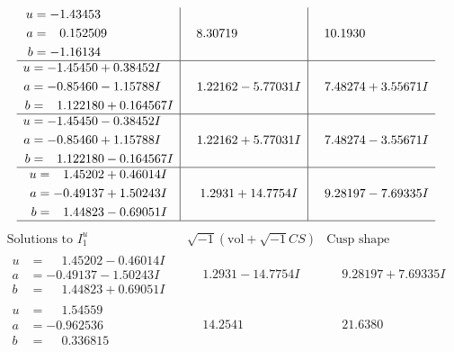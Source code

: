 \documentclass[1p]{elsarticle_modified}
\theoremstyle{definition}
\newcommand{\I}{\sqrt{-1}}
\begin{document}
$$\begin{array}{c|c|c}
\begin{aligned}
u &= -1.43453\phantom{ +0.000000I} \\
a &= \phantom{-}0.152509\phantom{ +0.000000I} \\
b &= -1.16134\phantom{ +0.000000I}\end{aligned}
 & \phantom{-}8.30719\phantom{ +0.000000I} & \phantom{-}10.1930\phantom{ +0.000000I} \\ \hline\begin{aligned}
u &= -1.45450 + 0.38452 I \\
a &= -0.85460 - 1.15788 I \\
b &= \phantom{-}1.122180 + 0.164567 I\end{aligned}
 & \phantom{-}1.22162 - 5.77031 I & \phantom{-}7.48274 + 3.55671 I \\ \hline\begin{aligned}
u &= -1.45450 - 0.38452 I \\
a &= -0.85460 + 1.15788 I \\
b &= \phantom{-}1.122180 - 0.164567 I\end{aligned}
 & \phantom{-}1.22162 + 5.77031 I & \phantom{-}7.48274 - 3.55671 I \\ \hline\begin{aligned}
u &= \phantom{-}1.45202 + 0.46014 I \\
a &= -0.49137 + 1.50243 I \\
b &= \phantom{-}1.44823 - 0.69051 I\end{aligned}
 & \phantom{-}1.2931 + 14.7754 I & \phantom{-}9.28197 - 7.69335 I\\
 \hline 
 \end{array}$$\newpage$$\begin{array}{c|c|c}  
\text{Solutions to }I^u_{1}& \I (\text{vol} + \sqrt{-1}CS) & \text{Cusp shape}\\
 \hline 
\begin{aligned}
u &= \phantom{-}1.45202 - 0.46014 I \\
a &= -0.49137 - 1.50243 I \\
b &= \phantom{-}1.44823 + 0.69051 I\end{aligned}
 & \phantom{-}1.2931 - 14.7754 I & \phantom{-}9.28197 + 7.69335 I \\ \hline\begin{aligned}
u &= \phantom{-}1.54559\phantom{ +0.000000I} \\
a &= -0.962536\phantom{ +0.000000I} \\
b &= \phantom{-}0.336815\phantom{ +0.000000I}\end{aligned}
 & \phantom{-}14.2541\phantom{ +0.000000I} & \phantom{-}21.6380\phantom{ +0.000000I} \\ \hline\begin{aligned}

\end{aligned}
\end{array}$$
\end{document}
